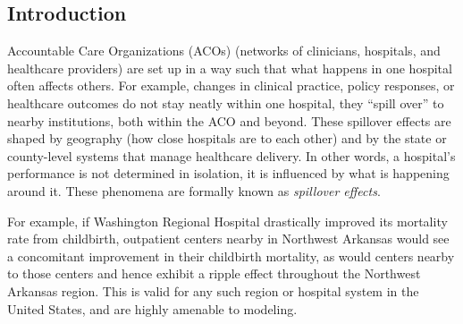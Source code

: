 \documentclass[10pt]{article}
\begin{document}


\subsection*{Introduction}

%

Accountable Care Organizations (ACOs) (networks of clinicians, hospitals, and healthcare providers) are set up in a way such that what happens in one hospital often affects others. For example, changes in clinical practice, policy responses, or healthcare outcomes do not stay neatly within one hospital, they ``spill over'' to nearby institutions, both within the ACO and beyond. These spillover effects are shaped by geography (how close hospitals are to each other) and by the state or county-level systems that manage healthcare delivery. In other words, a hospital's performance is not determined in isolation, it is influenced by what is happening around it. These phenomena are formally known as \textit{spillover effects}.

For example, if Washington Regional Hospital drastically improved its mortality rate from childbirth, outpatient centers nearby in Northwest Arkansas would see a concomitant improvement in their childbirth mortality, as would centers nearby to those centers and hence exhibit a ripple effect throughout the Northwest Arkansas region. This is valid for any such region or hospital system in the United States, and are highly amenable to modeling. 
\end{document}
